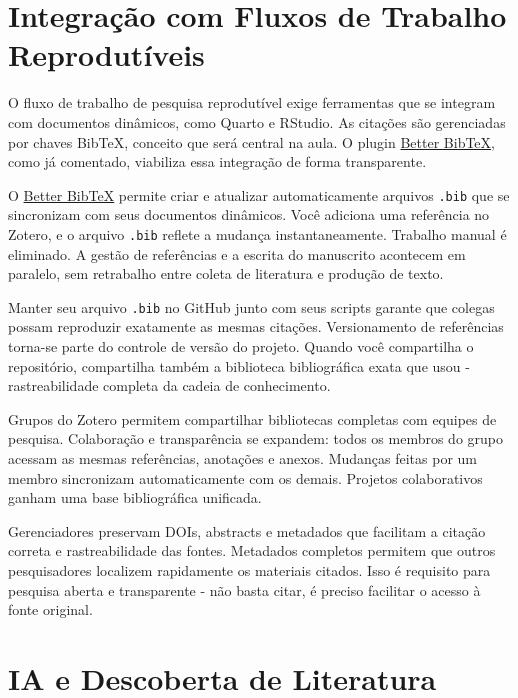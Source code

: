 \documentclass[
  a4paper,
]{book}
\begin{document}
\section{Integração com Fluxos de Trabalho
Reprodutíveis}\label{integrauxe7uxe3o-com-fluxos-de-trabalho-reprodutuxedveis}

O fluxo de trabalho de pesquisa reprodutível exige ferramentas que se
integram com documentos dinâmicos, como Quarto e RStudio. As citações
são gerenciadas por chaves BibTeX, conceito que será central na aula. O
plugin \href{https://retorque.re/zotero-better-bibtex/}{Better BibTeX},
como já comentado, viabiliza essa integração de forma transparente.

O \href{https://retorque.re/zotero-better-bibtex/}{Better BibTeX}
permite criar e atualizar automaticamente arquivos \texttt{.bib} que se
sincronizam com seus documentos dinâmicos. Você adiciona uma referência
no Zotero, e o arquivo \texttt{.bib} reflete a mudança instantaneamente.
Trabalho manual é eliminado. A gestão de referências e a escrita do
manuscrito acontecem em paralelo, sem retrabalho entre coleta de
literatura e produção de texto.

Manter seu arquivo \texttt{.bib} no GitHub junto com seus scripts
garante que colegas possam reproduzir exatamente as mesmas citações.
Versionamento de referências torna-se parte do controle de versão do
projeto. Quando você compartilha o repositório, compartilha também a
biblioteca bibliográfica exata que usou - rastreabilidade completa da
cadeia de conhecimento.

Grupos do Zotero permitem compartilhar bibliotecas completas com equipes
de pesquisa. Colaboração e transparência se expandem: todos os membros
do grupo acessam as mesmas referências, anotações e anexos. Mudanças
feitas por um membro sincronizam automaticamente com os demais. Projetos
colaborativos ganham uma base bibliográfica unificada.

Gerenciadores preservam DOIs, abstracts e metadados que facilitam a
citação correta e rastreabilidade das fontes. Metadados completos
permitem que outros pesquisadores localizem rapidamente os materiais
citados. Isso é requisito para pesquisa aberta e transparente - não
basta citar, é preciso facilitar o acesso à fonte original.

\section{IA e Descoberta de
Literatura}\label{ia-e-descoberta-de-literatura}
\end{document}
